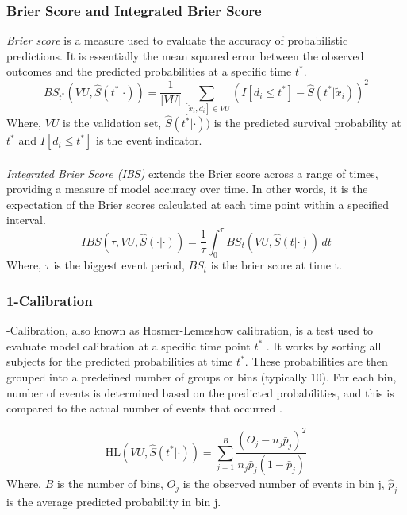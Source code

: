 \subsubsection*{Brier Score and Integrated Brier Score}
\textit{Brier score} is a measure used to evaluate the accuracy of probabilistic predictions. It is essentially the mean squared error \parencite{qi_effective_2023} between the observed outcomes and the predicted probabilities at a specific time \(t^{*}\).
\begin{equation} \label{eq:bs}BS_{t^*}(VU, \hat{S}(t^* | \cdot)) = \frac{1}{|VU|} \sum_{[\tilde{x}_i, d_i] \in VU} (I[d_i \leq t^*] - \hat{S}(t^* | \tilde{x}_i))^2\end{equation}
\noindent Where, \(VU\) is the validation set, \(\hat{S}(t^* | \cdot))\) is the predicted survival probability at \(t^{*}\) and \(I[d_i \leq t^*]\) is the event indicator.
\\\\
\noindent \textit{Integrated Brier Score (IBS)} extends the Brier score across a range of times, providing a measure of model accuracy over time. In other words, it is the expectation of the Brier scores calculated at each time point within a specified interval.
\begin{equation} \label{eq:ibs}IBS(\tau, VU, \hat{S}(\cdot | \cdot)) = \frac{1}{\tau} \int_0^{\tau} BS_t(VU, \hat{S}(t | \cdot)) \, dt\end{equation}
\noindent Where, \(\tau\) is the biggest event period, \(BS_{t}\) is the brier score at time t.
\subsubsection*{1-Calibration}
-Calibration, also known as Hosmer-Lemeshow calibration, is a test used to evaluate model calibration at a specific time point \(t^{*}\) \parencite{haider_effective_2018}.
It works by sorting all subjects for the predicted probabilities at time \(t^{*}\). These probabilities are then grouped into a predefined number of groups or bins (typically 10). For each bin, number of events is determined based on the predicted probabilities, and this is compared to the actual number of events that occurred \parencite{qi_effective_2023}.

\begin{equation} \label{eq:c1}\text{HL}(VU, \hat{S}(t^* | \cdot)) = \sum_{j=1}^B \frac{(O_j - n_j \bar{p}_j)^2}{n_j \bar{p}_j (1 - \bar{p}_j)}\end{equation}
\noindent Where, \(B\) is the number of bins, \(O_{j}\) is the observed number of events in bin j, \(\hat{p}_{j}\) is the average predicted probability in bin j. 

